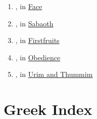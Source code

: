\begin{enumerate}
		\item \hyperref[PANEH]{}, in \hyperref[FACE]{Face}
		
		\item \hyperref[TSAVA]{}, in \hyperref[SABAOTH]{Sabaoth}
		
		\item \hyperref[RESHIT]{}, in \hyperref[FIRSTFRUITS]{Firstfruits}
		
		\item \hyperref[SHAMA]{}, in \hyperref[OBEDIENCE]{Obedience}
		
		\item \hyperref[TUMMIM]{}, in \hyperref[URIMTHUMMIM]{Urim and Thummim}
	
	\end{enumerate}
	
\section{Greek Index}
	\label{GREEKINDEX}
	
